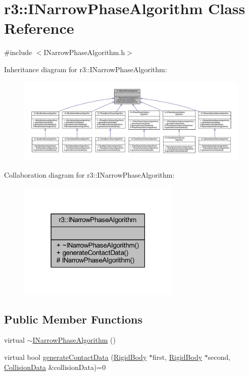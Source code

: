 \hypertarget{classr3_1_1_i_narrow_phase_algorithm}{}\section{r3\+:\+:I\+Narrow\+Phase\+Algorithm Class Reference}
\label{classr3_1_1_i_narrow_phase_algorithm}


{\ttfamily \#include $<$I\+Narrow\+Phase\+Algorithm.\+h$>$}



Inheritance diagram for r3\+:\+:I\+Narrow\+Phase\+Algorithm\+:\nopagebreak
\begin{figure}[H]
\begin{center}
\leavevmode
\includegraphics[width=350pt]{classr3_1_1_i_narrow_phase_algorithm__inherit__graph}
\end{center}
\end{figure}


Collaboration diagram for r3\+:\+:I\+Narrow\+Phase\+Algorithm\+:\nopagebreak
\begin{figure}[H]
\begin{center}
\leavevmode
\includegraphics[width=219pt]{classr3_1_1_i_narrow_phase_algorithm__coll__graph}
\end{center}
\end{figure}
\subsection*{Public Member Functions}
\begin{DoxyCompactItemize}
\item 
virtual \mbox{\hyperlink{classr3_1_1_i_narrow_phase_algorithm_a5c60462a72d97075b147bc4f0392b4f8}{$\sim$\+I\+Narrow\+Phase\+Algorithm}} ()
\item 
virtual bool \mbox{\hyperlink{classr3_1_1_i_narrow_phase_algorithm_a606fe8de5fe81ff45fedb81ca74717c3}{generate\+Contact\+Data}} (\mbox{\hyperlink{classr3_1_1_rigid_body}{Rigid\+Body}} $\ast$first, \mbox{\hyperlink{classr3_1_1_rigid_body}{Rigid\+Body}} $\ast$second, \mbox{\hyperlink{classr3_1_1_collision_data}{Collision\+Data}} \&collision\+Data)=0
\end{DoxyCompactItemize}
